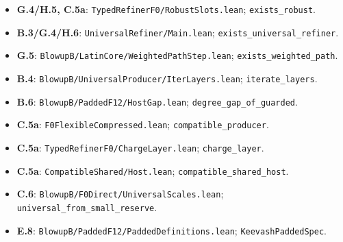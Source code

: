 \documentclass[spanish,11pt,a4paper]{article}
\begin{document}
\begin{itemize}
\item
  \textbf{G.4/H.5, C.5a}: \texttt{Typed\allowbreak{}Refiner\allowbreak{}\allowbreak{}F0/\allowbreak{}Robust\allowbreak{}Slo\allowbreak{}ts.\allowbreak{}lean}; \texttt{exists\_\allowbreak{}robus\allowbreak{}t}.
\item
  \textbf{B.3/G.4/H.6}: \texttt{Universal\allowbreak{}Ref\allowbreak{}iner/\allowbreak{}Main.\allowbreak{}le\allowbreak{}an}; \texttt{exists\_\allowbreak{}unive\allowbreak{}rsal\_\allowbreak{}refiner\allowbreak{}}.
\item
  \textbf{G.5}: \texttt{Blowup\allowbreak{}B/\allowbreak{}Lati\allowbreak{}n\allowbreak{}Core/\allowbreak{}Weight\allowbreak{}ed\allowbreak{}Path\allowbreak{}Step.\allowbreak{}l\allowbreak{}ean}; \texttt{exists\_\allowbreak{}weigh\allowbreak{}ted\_\allowbreak{}path}.
\item
  \textbf{B.4}: \texttt{Blowup\allowbreak{}B/\allowbreak{}Univ\allowbreak{}ersal\allowbreak{}Produce\allowbreak{}r/\allowbreak{}Iter\allowbreak{}Layers\allowbreak{}.\allowbreak{}lean}; \texttt{iterate\_\allowbreak{}laye\allowbreak{}rs}.
\item
  \textbf{B.6}: \texttt{Blowup\allowbreak{}B/\allowbreak{}Padd\allowbreak{}ed\allowbreak{}F12/\allowbreak{}Host\allowbreak{}Ga\allowbreak{}p.\allowbreak{}lean}; \texttt{degree\_\allowbreak{}gap\_\allowbreak{}o\allowbreak{}f\_\allowbreak{}guarded}.
\item
  \textbf{C.5a}: \texttt{F0Flexible\allowbreak{}Co\allowbreak{}mpressed.\allowbreak{}lea\allowbreak{}n}; \texttt{compatible\_\allowbreak{}p\allowbreak{}roducer}.
\item
  \textbf{C.5a}: \texttt{Typed\allowbreak{}Refiner\allowbreak{}\allowbreak{}F0/\allowbreak{}Charge\allowbreak{}Lay\allowbreak{}er.\allowbreak{}lean}; \texttt{charge\_\allowbreak{}layer\allowbreak{}}.
\item
  \textbf{C.5a}: \texttt{Compatible\allowbreak{}Sh\allowbreak{}ared/\allowbreak{}Host.\allowbreak{}le\allowbreak{}an}; \texttt{compatible\_\allowbreak{}s\allowbreak{}hared\_\allowbreak{}host}.
\item
  \textbf{C.6}: \texttt{Blowup\allowbreak{}B/\allowbreak{}F0Di\allowbreak{}rect/\allowbreak{}Univers\allowbreak{}al\allowbreak{}Scales.\allowbreak{}lea\allowbreak{}n}; \texttt{universal\_\allowbreak{}fr\allowbreak{}om\_\allowbreak{}small\_\allowbreak{}res\allowbreak{}erve}.
\item
  \textbf{E.8}: \texttt{Blowup\allowbreak{}B/\allowbreak{}Padd\allowbreak{}ed\allowbreak{}F12/\allowbreak{}Padded\allowbreak{}\allowbreak{}Definitions.\allowbreak{}\allowbreak{}lean}; \texttt{Keevash\allowbreak{}Padde\allowbreak{}d\allowbreak{}Spec}.

\end{itemize}
\end{document}
